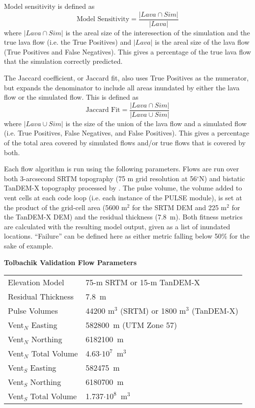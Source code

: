		Model sensitivity is defined as
		\begin{equation}
			\text{Model~Sensitivity}=\frac{|Lava\cap Sim|}{|Lava|}
		\label{eq_sensitivity}
		\end{equation}
		where $|Lava\cap Sim|$ is the areal size of the interesection of the simulation and the true lava flow (i.e. the True Positives) and $|Lava|$ is the areal size of the lava flow (True Positives and False Negatives). This gives a percentage of the true lava flow that the simulation correctly predicted. 
		
		The Jaccard coefficient, or Jaccard fit, also uses True Positives as the numerator, but expands the denominator to include all areas inundated by either the lava flow or the simulated flow. This is defined as 
		\begin{equation}
			\text{Jaccard~Fit}=\frac{|Lava\cap Sim|}{|Lava\cup Sim|}
		\end{equation}
		where $|Lava\cup Sim|$ is the size of the union of the lava flow and a simulated flow (i.e. True Positives, False Negatives, and False Positives). This gives a percentage of the total area covered by simulated flows and/or true flows that is covered by both.
		
		Each flow algorithm is run using the following parameters. Flows are run over both 3-arcsecond SRTM topography (75 m grid resolution at 56$^{\circ}$N) and bistatic TanDEM-X topography processed by \citet{kubanek2015lava}. The pulse volume, the volume added to vent cells at each code loop (i.e. each instance of the PULSE module), is set at the product of the grid-cell area (5600 m$^2$ for the SRTM DEM and 225 m$^2$ for the TanDEM-X DEM) and the residual thickness (7.8~m). Both fitness metrics are calculated with the resulting model output, given as a list of inundated locations. ``Failure'' can be defined here as either metric falling below 50\% for the sake of example.
		
		\begin{center}
			\textbf{Tolbachik Validation Flow Parameters}\\
			\begin{tabular}{l l}
				\toprule
				Elevation Model & 75-m SRTM or 15-m TanDEM-X\\
				Residual Thickness & 7.8~m\\
				Pulse Volumes & 44200 m$^3$ (SRTM) or 1800 m$^3$ (TanDEM-X)\\
				\midrule
				Vent$_N$ Easting & 582800~m (UTM Zone 57)\\
				Vent$_N$ Northing & 6182100~m\\
				Vent$_N$ Total Volume & 4.63$\cdot10^7$~m$^3$\\
				\midrule
				Vent$_S$ Easting & 582475~m\\
				Vent$_S$ Northing & 6180700~m\\
				Vent$_S$ Total Volume & 1.737$\cdot10^8$~m$^3$\\
				\bottomrule
			\end{tabular}
		\end{center}
			

